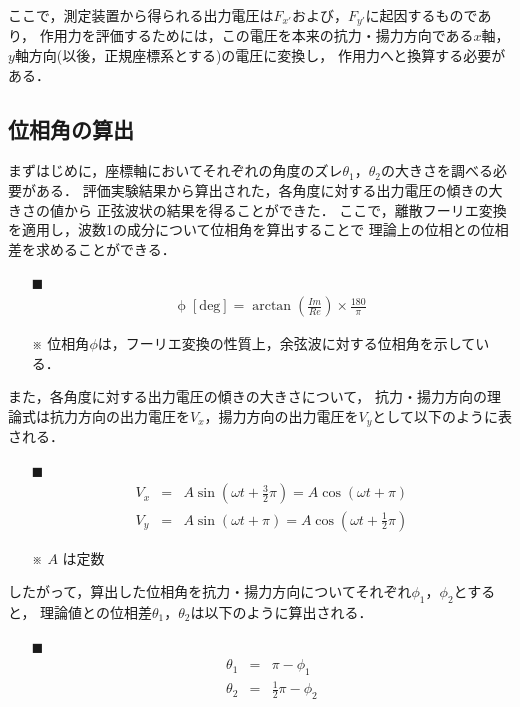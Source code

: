 \documentclass[twocolumn,a4j]{jsarticle}
\begin{document}
ここで，測定装置から得られる出力電圧は$F_{x'}$および，$F_{y'}$に起因するものであり，
作用力を評価するためには，この電圧を本来の抗力・揚力方向である$x$軸，$y$軸方向(以後，正規座標系とする)の電圧に変換し，
作用力へと換算する必要がある．\\

\subsection{位相角の算出}
まずはじめに，座標軸においてそれぞれの角度のズレ$\theta_1$，$\theta_2$の大きさを調べる必要がある．
評価実験結果から算出された，各角度に対する出力電圧の傾きの大きさの値から
正弦波状の結果を得ることができた．
ここで，離散フーリエ変換を適用し，波数1の成分について位相角を算出することで
理論上の位相との位相差を求めることができる．

\begin{itemize}
    \item [$\blacksquare$] 
          \begin{eqnarray*}
              \mathrm{\phi \; [deg]} = \arctan \left(\frac{Im}{Re}\right) × \frac{180}{\pi}
          \end{eqnarray*}
    \item [※] 位相角$\phi$は，フーリエ変換の性質上，余弦波に対する位相角を示している．
\end{itemize}

また，各角度に対する出力電圧の傾きの大きさについて，
抗力・揚力方向の理論式は抗力方向の出力電圧を$V_{x}$，揚力方向の出力電圧を$V_{y}$として以下のように表される．

\begin{itemize}
    \item [$\blacksquare$] 
          \begin{eqnarray*}
              V_{x} &=& A \sin\left(\omega t + \frac{3}{2}\pi\right) = A \cos\left(\omega t + \pi\right)\\
              V_{y} &=& A \sin\left(\omega t + \pi\right) = A \cos\left(\omega t + \frac{1}{2}\pi\right)
          \end{eqnarray*}
    \item [※] $A$ は定数
\end{itemize}

したがって，算出した位相角を抗力・揚力方向についてそれぞれ$\phi_1$，$\phi_2$とすると，
理論値との位相差$\theta_1$，$\theta_2$は以下のように算出される．

\begin{itemize}
    \item [$\blacksquare$] 
          \begin{eqnarray*}
              \theta_1 &=& \pi - \phi_1\\
              \theta_2 &=& \frac{1}{2} \pi - \phi_2
          \end{eqnarray*}
\end{itemize}
\end{document}
